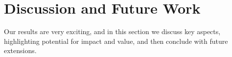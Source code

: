 \section{Discussion and Future Work}

  Our results are very exciting, and in this section we
  discuss key aspects, highlighting potential for impact and
  value, and then conclude with future extensions.

